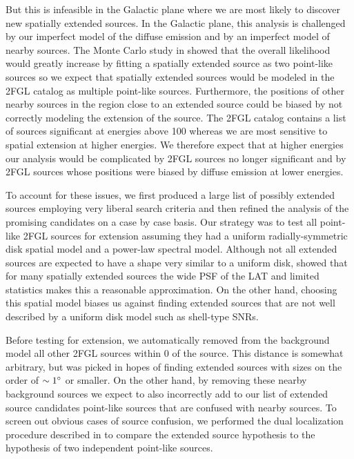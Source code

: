 But this is infeasible in the Galactic plane where we are most likely to
discover new spatially extended sources.  In the Galactic plane, this
analysis is challenged by our imperfect model of the diffuse emission
and by an imperfect model of nearby sources.  The Monte Carlo study in
 showed that the overall likelihood
would greatly increase by fitting a spatially extended source as two
point-like sources so we expect that spatially extended sources would be
modeled in the 2FGL catalog as multiple point-like sources. Furthermore,
the positions of other nearby sources in the region close to an extended
source could be biased by not correctly modeling the extension of
the source.  The 2FGL catalog contains a list of sources significant at
energies above 100 \mev whereas we are most sensitive to spatial extension
at higher energies.  We therefore expect that at higher energies our
analysis would be complicated by 2FGL sources no longer significant
and by 2FGL sources whose positions were biased by diffuse emission at
lower energies.

To account for these issues, we first produced a large list of possibly
extended sources employing very liberal search criteria and then refined
the analysis of the promising candidates on a case by case basis.  Our
strategy was to test all point-like 2FGL sources for extension assuming
they had a uniform radially-symmetric disk spatial model and a power-law
spectral model.  Although not all extended sources are expected to have
a shape very similar to a uniform disk, 
showed that for many spatially extended sources the wide PSF of the LAT
and limited statistics makes this a reasonable approximation.  On the
other hand, choosing this spatial model biases us against finding
extended sources that are not well described by a uniform disk model
such as shell-type SNRs.

Before testing for extension, we automatically removed from the
background model all other 2FGL sources within 0 of the source.
This distance is somewhat arbitrary, but was picked in hopes of finding
extended sources with sizes on the order of $\sim1^\circ$ or smaller. On
the other hand, by removing these nearby background sources we expect to
also incorrectly add to our list of extended source candidates point-like
sources that are confused with nearby sources.  To screen out obvious
cases of source confusion, we performed the dual localization procedure
described in  to compare the extended
source hypothesis to the hypothesis of two independent point-like sources.

